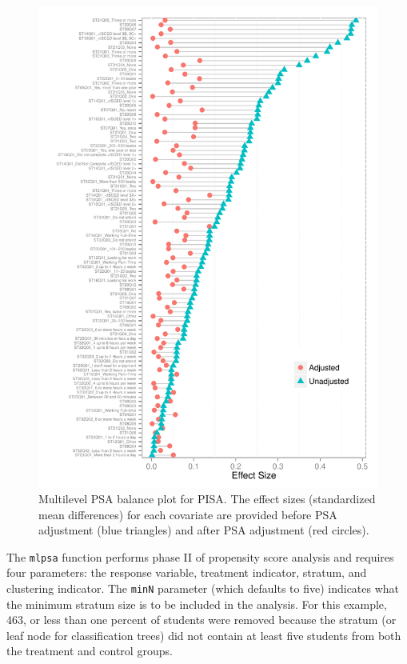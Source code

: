 \documentclass[letterpaper,12pt]{article} %
\begin{document}
\setlength{\belowcaptionskip}{-10pt}
\begin{figure}[h!]
\begin{center}
\includegraphics[height=.90\textheight]{../Figures/pisabalance.pdf}
\caption[Multilevel PSA balance plot for PISA]{Multilevel PSA balance plot for PISA. The effect sizes (standardized mean differences) for each covariate are provided before PSA adjustment (blue triangles) and after PSA adjustment (red circles).}
\end{center}
\end{figure}
\setlength{\belowcaptionskip}{0pt}

\clearpage

The \texttt{mlpsa} function performs phase II of propensity score analysis and requires four parameters: the response variable, treatment indicator, stratum, and clustering indicator. The \texttt{minN} parameter (which defaults to five) indicates what the minimum stratum size is to be included in the analysis. For this example, 463, or less than one percent of students were removed because the stratum (or leaf node for classification trees) did not contain at least five students from both the treatment and control groups.
\end{document}
